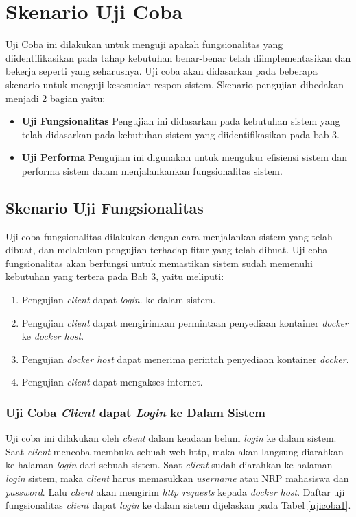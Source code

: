     \section{Skenario Uji Coba}
    Uji Coba ini dilakukan untuk menguji apakah fungsionalitas yang diidentifikasikan pada tahap kebutuhan benar-benar telah diimplementasikan dan bekerja seperti yang seharusnya. Uji coba akan didasarkan pada beberapa skenario untuk menguji kesesuaian respon sistem. Skenario pengujian dibedakan menjadi 2 bagian yaitu:
    \begin{itemize}
    	\item \textbf{Uji Fungsionalitas}
        Pengujian ini didasarkan pada kebutuhan sistem yang telah didasarkan pada kebutuhan sistem yang diidentifikasikan pada bab 3.
        \item \textbf{Uji Performa}
        Pengujian ini digunakan untuk mengukur efisiensi sistem dan performa sistem dalam menjalankankan fungsionalitas sistem.
    \end{itemize}
      \subsection{Skenario Uji Fungsionalitas}
      Uji coba fungsionalitas dilakukan dengan cara menjalankan sistem yang telah dibuat, dan melakukan pengujian terhadap fitur yang telah dibuat. Uji coba fungsionalitas akan berfungsi untuk memastikan sistem sudah memenuhi kebutuhan yang tertera pada Bab 3, yaitu meliputi:
   \begin{enumerate}
      \item Pengujian \textit{client} dapat \textit{login}. ke dalam sistem.
      \item Pengujian \textit{client} dapat mengirimkan permintaan penyediaan kontainer \textit{docker} ke \textit{docker host}.
      \item Pengujian \textit{docker host} dapat menerima perintah penyediaan kontainer \textit{docker}.
      \item Pengujian \textit{client} dapat mengakses internet.
      \end{enumerate}
      
\subsubsection{Uji Coba \textit{Client} dapat \textit{Login} ke Dalam Sistem}
Uji coba ini dilakukan oleh \textit{client} dalam keadaan belum \textit{login} ke dalam sistem. Saat \textit{client} mencoba membuka sebuah web http, maka akan langsung diarahkan ke halaman \textit{login} dari sebuah sistem. Saat \textit{client} sudah diarahkan ke halaman \textit{login} sistem, maka \textit{client} harus memasukkan \textit{username} atau NRP mahasiswa dan \textit{password}. Lalu \textit{client} akan mengirim \textit{http requests} kepada \textit{docker host}. Daftar uji fungsionalitas \textit{client} dapat \textit{login} ke dalam sistem dijelaskan pada Tabel \ref{ujicoba1}.

